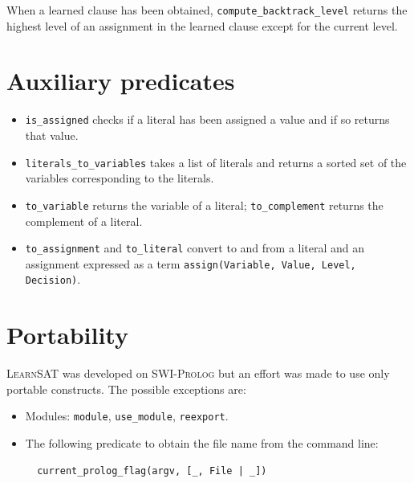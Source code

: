 \documentclass[11pt]{report}
\newcommand*{\p}[1]{\textup{\texttt{#1}}}
\newcommand*{\ls}{\textsc{LearnSAT}}
\newcommand*{\sw}{\textsc{SWI-Prolog}}
\begin{document}
When a learned clause has been obtained, \p{compute\_backtrack\_level}
returns the highest level of an assignment in the learned clause except
for the current level.


\section{Auxiliary predicates}\label{s.aux}

\begin{itemize}

\item \p{is\_assigned} checks if a literal has been assigned a value
and if so returns that value.

\item \p{literals\_to\_variables} takes a list of literals and returns a
sorted set of the variables corresponding to the literals.

\item \p{to\_variable} returns the variable of a literal;
\p{to\_complement} returns the complement of a literal.

\item \p{to\_assignment} and \p{to\_literal} convert to and from a
literal and an assignment expressed as a term \p{assign(Variable, Value,
Level, Decision)}.

\end{itemize}


\section{Portability}\label{s.port}

\ls{} was developed on \sw{} but an effort was made to use only portable
constructs. The possible exceptions are:

\begin{itemize}
\item Modules: \p{module}, \p{use\_module}, \p{reexport}.
\item The following predicate to obtain the file name from the command
line:
\begin{verbatim}
  current_prolog_flag(argv, [_, File | _])
\end{verbatim}
\end{itemize}



\end{document}
